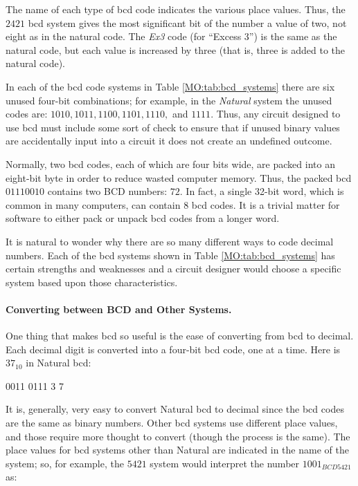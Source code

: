 The name of each type of \gls{bcd} code indicates the various place values. Thus, the $ 2421 $ \gls{bcd} system gives the most significant bit of the number a value of two, not eight as in the natural code. The \emph{Ex3} code (for ``Excess 3'') is the same as the natural code, but each value is increased by three (that is, three is added to the natural code). 

In each of the \gls{bcd} code systems in Table \ref{MO:tab:bcd_systems} there are six unused four-bit combinations; for example, in the \emph{Natural} system the unused codes are: $ 1010, 1011, 1100, 1101, 1110, $ and $ 1111 $. Thus, any circuit designed to use \gls{bcd} must include some sort of check to ensure that if unused binary values are accidentally input into a circuit it does not create an undefined outcome.

Normally, two \gls{bcd} codes, each of which are four bits wide, are packed into an eight-bit byte in order to reduce wasted computer memory. Thus, the packed \gls{bcd} $ 0111 0010 $ contains two BCD numbers: $ 72 $. In fact, a single 32-bit word, which is common in many computers, can contain $ 8 $ \gls{bcd} codes. It is a trivial matter for software to either pack or unpack \gls{bcd} codes from a longer word.

It is natural to wonder why there are so many different ways to code decimal numbers. Each of the \gls{bcd} systems shown in Table \ref{MO:tab:bcd_systems} has certain strengths and weaknesses and a circuit designer would choose a specific system based upon those characteristics.

\paragraph{Converting between BCD and Other Systems.} One thing that makes \gls{bcd} so useful is the ease of converting from \gls{bcd} to decimal. Each decimal digit is converted into a four-bit \gls{bcd} code, one at a time. Here is $ 37_{10} $ in Natural \gls{bcd}:

\begin{binDisp}
     0011 0111
       3    7
\end{binDisp}

It is, generally, very easy to convert Natural \gls{bcd} to decimal since the \gls{bcd} codes are the same as binary numbers. Other \gls{bcd} systems use different place values, and those require more thought to convert (though the process is the same). The place values for \gls{bcd} systems other than Natural are indicated in the name of the system; so, for example, the $ 5421 $ system would interpret the number $ 1001_{BCD5421} $ as:

